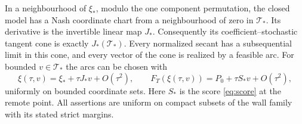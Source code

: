 \begin{proposition}\label{prop:remote-cone}
In a neighbourhood of $\xi_*$, modulo the one component permutation,
the closed model has a Nash coordinate chart from a neighbourhood of
zero in $\mathcal T_*$. Its derivative is the invertible linear map
$J_*$. Consequently its coefficient--stochastic tangent cone is exactly
$J_*(\mathcal T_*)$. Every normalized secant has a subsequential limit
in this cone, and every vector of the cone is realized by a feasible
arc. For bounded $v\in\mathcal T_*$ the arcs can be chosen with
\begin{equation}\label{eq:remote-second-order}
 \xi(\tau,v)=\xi_*+\tau J_*v+O(\tau^2),\qquad
 F_T(\xi(\tau,v))=P_0+\tau S_*v+O(\tau^2),
\end{equation}
uniformly on bounded coordinate sets. Here $S_*$ is the score
\eqref{eq:score} at the remote point. All assertions are uniform on
compact subsets of the wall family with its stated strict margins.
\end{proposition}
